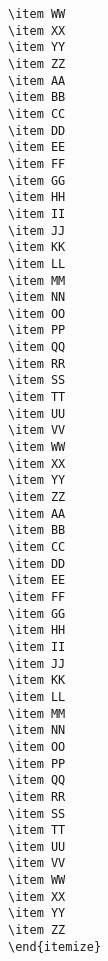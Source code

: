 \documentclass{article}
\begin{document}
\begin{verbatim}
\item WW
\item XX
\item YY
\item ZZ
\item AA
\item BB
\item CC
\item DD
\item EE
\item FF
\item GG
\item HH
\item II
\item JJ
\item KK
\item LL
\item MM
\item NN
\item OO
\item PP
\item QQ
\item RR
\item SS
\item TT
\item UU
\item VV
\item WW
\item XX
\item YY
\item ZZ
\item AA
\item BB
\item CC
\item DD
\item EE
\item FF
\item GG
\item HH
\item II
\item JJ
\item KK
\item LL
\item MM
\item NN
\item OO
\item PP
\item QQ
\item RR
\item SS
\item TT
\item UU
\item VV
\item WW
\item XX
\item YY
\item ZZ
\end{itemize}
\end{verbatim}

\twoline
\end{document}
